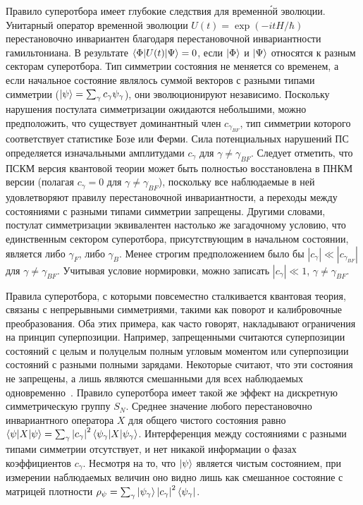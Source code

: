 \documentclass[a4paper, 12pt]{article}
\begin{document}
Правило суперотбора имеет глубокие следствия для временн\'{о}й эволюции. 
Унитарный оператор временной эволюции $U(t) = \exp(-itH/\hbar)$ 
перестановочно инвариантен благодаря перестановочной инвариантности 
гамильтониана. В результате ${\left\langle\Phi\middle|U(t)\middle|\Psi\right\rangle} = 0$, если 
${\left|\Phi\right\rangle}$ и ${\left|\Psi\right\rangle}$ относятся к разным секторам суперотбора. Тип 
симметрии состояния не меняется со временем, а если начальное состояние 
являлось суммой векторов с разными типами симметрии (${\left|\psi\right\rangle} 
= \sum_\gamma c_\gamma \psi_\gamma$), они эволюционируют независимо.
%
Поскольку нарушения постулата симметризации ожидаются небольшими, можно 
предположить, что существует доминантный член $c_{\gamma_{BF}}$, тип 
симметрии которого соответствует статистике Бозе или Ферми. Сила 
потенциальных нарушений ПС определяется изначальными амплитудами 
$c_\gamma$ для $\gamma\neq\gamma_{BF}$.
%
Следует отметить, что ПСКМ версия квантовой теории может быть полностью 
восстановлена в ПНКМ версии (полагая $c_\gamma = 0$ для $\gamma \neq 
\gamma_{BF}$), поскольку все наблюдаемые в ней удовлетворяют правилу 
перестановочной инвариантности, а переходы между состояниями с разными 
типами симметрии запрещены. Другими словами, постулат симметризации 
эквивалентен настолько же загадочному условию, что единственным сектором 
суперотбора, присутствующим в начальном состоянии, является либо 
$\gamma_F$, либо $\gamma_B$. Менее строгим предположением было бы 
$\left|c_\gamma\right| \ll \left|c_{\gamma_{BF}}\right| $ для 
$\gamma\neq\gamma_{BF}$. Учитывая условие нормировки, можно записать
$\left|c_\gamma\right| \ll 1 $, $\gamma\neq\gamma_{BF}$.

Правила суперотбора, с которыми повсеместно сталкивается квантовая 
теория, связаны с непрерывными симметриями, такими как поворот 
и калибровочные преобразования. Оба этих примера, как часто говорят, 
накладывают ограничения на принцип суперпозиции. Например, запрещенными 
считаются суперпозиции состояний с целым и полуцелым полным угловым 
моментом или суперпозиции состояний с разными полными зарядами.
%
Некоторые считают, что эти состояния не запрещены, а лишь являются 
смешанными для всех наблюдаемых одновременно~\cite[Гл.~III.1]{ref15}.
%
Правило суперотбора имеет такой же эффект на дискретную симметрическую 
группу $S_N$. Среднее значение любого перестановочно инвариантного 
оператора $X$ для общего чистого состояния равно 
${\left\langle\psi\middle|X\middle|\psi\right\rangle} = \sum_\gamma \left|c_\gamma\right|^2 
{\left\langle\psi_\gamma\middle|X\middle|\psi_\gamma\right\rangle}$. Интерференция между 
состояниями с разными типами симметрии отсутствует, и нет никакой 
информации о фазах коэффициентов $c_\gamma$. Несмотря на то, что 
${\left|\psi\right\rangle}$ является чистым состоянием, при измерении наблюдаемых 
величин оно видно лишь как смешанное состояние с матрицей плотности 
$\rho_\psi = \sum_\gamma {\left|\psi_\gamma\right\rangle} \left|c_\gamma\right|^2 
{\left\langle\psi_\gamma\right|}$.
\end{document}
